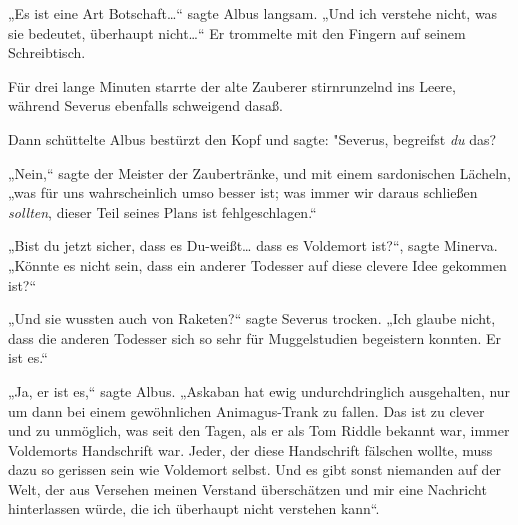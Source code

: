 „Es ist eine Art Botschaft…“ sagte Albus langsam. „Und ich verstehe nicht, was sie bedeutet, überhaupt nicht…“ Er trommelte mit den Fingern auf seinem Schreibtisch.

Für drei lange Minuten starrte der alte Zauberer stirnrunzelnd ins Leere, während Severus ebenfalls schweigend dasaß.

Dann schüttelte Albus bestürzt den Kopf und sagte: "Severus, begreifst \emph{du} das?

„Nein,“ sagte der Meister der Zaubertränke, und mit einem sardonischen Lächeln, „was für uns wahrscheinlich umso besser ist; was immer wir daraus schließen \emph{sollten}, dieser Teil seines Plans ist fehlgeschlagen.“

„Bist du jetzt sicher, dass es Du-weißt… dass es Voldemort ist?“, sagte Minerva. „Könnte es nicht sein, dass ein anderer Todesser auf diese clevere Idee gekommen ist?“

„Und sie wussten auch von Raketen?“ sagte Severus trocken. „Ich glaube nicht, dass die anderen Todesser sich so sehr für Muggelstudien begeistern konnten. Er ist es.“

„Ja, er ist es,“ sagte Albus. „Askaban hat ewig undurchdringlich ausgehalten, nur um dann bei einem gewöhnlichen Animagus-Trank zu fallen. Das ist zu clever und zu unmöglich, was seit den Tagen, als er als Tom Riddle bekannt war, immer Voldemorts Handschrift war. Jeder, der diese Handschrift fälschen wollte, muss dazu so gerissen sein wie Voldemort selbst. Und es gibt sonst niemanden auf der Welt, der aus Versehen meinen Verstand überschätzen und mir eine Nachricht hinterlassen würde, die ich überhaupt nicht verstehen kann“.

